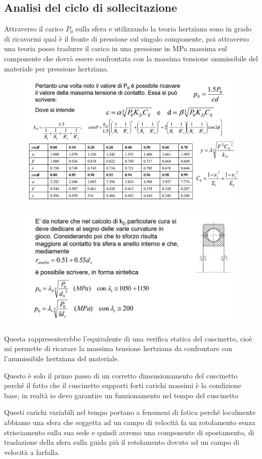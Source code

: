 \documentclass[a4paper, 15pt]{article}
\begin{document}
				\subsection{Analisi del ciclo di sollecitazione}
			Attraverso il carico $P_0$ sulla sfera e utilizzando la teoria hertziana sono in grado di ricavarmi qual è il fronte di pressione sul singolo componente, poi attraverso una teoria posso tradurre il carico in una pressione in MPa massima sul componente che dovrà essere confrontata con la massima tensione ammissibile del materiale per pressione hertziana.
			\begin{figure}[H]
				\centering
				\includegraphics[width=0.5\linewidth]{immagini/screenshot017}
				\label{fig:screenshot017}
			\end{figure}
			\begin{figure}[H]
				\centering
				\includegraphics[width=0.5\linewidth]{immagini/screenshot018}
				\label{fig:screenshot018}
			\end{figure}
			Questa rappresenterebbe l’equivalente di una verifica statica del cuscinetto, cioè mi permette di ricavare la massima tensione hertziana da confrontare con l’ammissibile hertziana del materiale. \newline 
			
			Questo è solo il primo passo di un corretto dimensionamento del cuscinetto perché il fatto che il cuscinetto supporti forti carichi massimi è la condizione base, in realtà io devo garantire un funzionamento nel tempo del cuscinetto 
			
			Questi carichi variabili nel tempo portano a fenomeni di fatica perché localmente abbiamo una sfera che soggetta ad un campo di velocità fa un rotolamento senza strisciamento sulla sua sede e quindi avremo una componente di spostamento, di traslazione della sfera sulla guida più il rotolamento dovuto ad un campo di velocità a farfalla. \newline 
			
\end{document}
